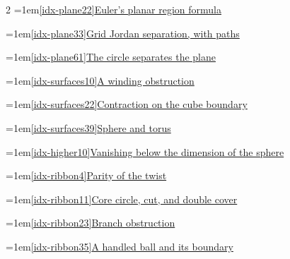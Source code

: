 \begin{multicols}{2}
\noindent\hangindent=1em\hyperref[idx-plane22]{\ref*{idx-plane22}\enspace Euler's planar region formula}\nobreak\dotfill\,\pageref{idx-plane22}\par
\noindent\hangindent=1em\hyperref[idx-plane33]{\ref*{idx-plane33}\enspace Grid Jordan separation, with paths}\nobreak\dotfill\,\pageref{idx-plane33}\par
\noindent\hangindent=1em\hyperref[idx-plane61]{\ref*{idx-plane61}\enspace The circle separates the plane}\nobreak\dotfill\,\pageref{idx-plane61}\par
\par\addvspace{6pt}\par\nobreak
\noindent\hangindent=1em\hyperref[idx-surfaces10]{\ref*{idx-surfaces10}\enspace A winding obstruction}\nobreak\dotfill\,\pageref{idx-surfaces10}\par
\noindent\hangindent=1em\hyperref[idx-surfaces22]{\ref*{idx-surfaces22}\enspace Contraction on the cube boundary}\nobreak\dotfill\,\pageref{idx-surfaces22}\par
\noindent\hangindent=1em\hyperref[idx-surfaces39]{\ref*{idx-surfaces39}\enspace Sphere and torus}\nobreak\dotfill\,\pageref{idx-surfaces39}\par
\noindent\hangindent=1em\hyperref[idx-higher10]{\ref*{idx-higher10}\enspace Vanishing below the dimension of the sphere}\nobreak\dotfill\,\pageref{idx-higher10}\par
\par\addvspace{6pt}\par\nobreak
\noindent\hangindent=1em\hyperref[idx-ribbon4]{\ref*{idx-ribbon4}\enspace Parity of the twist}\nobreak\dotfill\,\pageref{idx-ribbon4}\par
\noindent\hangindent=1em\hyperref[idx-ribbon11]{\ref*{idx-ribbon11}\enspace Core circle, cut, and double cover}\nobreak\dotfill\,\pageref{idx-ribbon11}\par
\noindent\hangindent=1em\hyperref[idx-ribbon23]{\ref*{idx-ribbon23}\enspace Branch obstruction}\nobreak\dotfill\,\pageref{idx-ribbon23}\par
\noindent\hangindent=1em\hyperref[idx-ribbon35]{\ref*{idx-ribbon35}\enspace A handled ball and its boundary}\nobreak\dotfill\,\pageref{idx-ribbon35}\par
\par\addvspace{6pt}\par\nobreak

\end{multicols}
